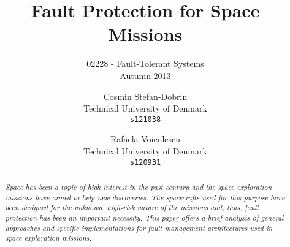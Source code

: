 \documentclass[11pt,a4paper]{article} %
\title{Fault Protection for Space Missions}
\subtitle{02228 - Fault-Tolerant Systems\\
Autumn 2013}
\author{
  Cosmin Stefan-Dobrin\\
  Technical University of Denmark\\
  \texttt{s121038}
  \and
  Rafaela Voiculescu\\
  Technical University of Denmark\\
  \texttt{s120931}
}
\date{}
\begin{document}
\begin{titlepage}
\maketitle 
\thispagestyle{empty}
\vfill
\begin{abstract}
\textit{Space has been a topic of high interest in the past century and the
space exploration missions have aimed to help new discoveries. The spacecrafts
used for this purpose have been designed for the unknown, high-risk nature of
the missions and, thus, fault protection has been an important necessity. This
paper offers a brief analysis of general approaches and specific implementations
for fault management architectures used in space exploration missions. }
\end{abstract}
\end{titlepage}
\newpage

\tableofcontents








 

\nocite{*}

\end{document}
